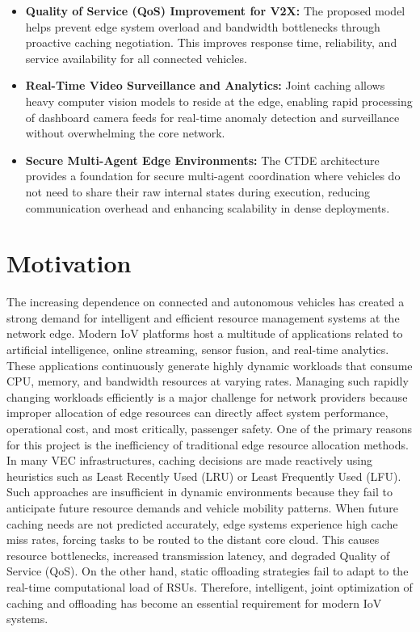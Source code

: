 \documentclass[12pt,a4paper]{report}
\begin{document}
\begin{itemize}
\item \textbf{Quality of Service (QoS) Improvement for V2X:}  
The proposed model helps prevent edge system overload and bandwidth bottlenecks through proactive caching negotiation. This improves response time, reliability, and service availability for all connected vehicles.

\item \textbf{Real-Time Video Surveillance and Analytics:}  
Joint caching allows heavy computer vision models to reside at the edge, enabling rapid processing of dashboard camera feeds for real-time anomaly detection and surveillance without overwhelming the core network.

\item \textbf{Secure Multi-Agent Edge Environments:}  
The CTDE architecture provides a foundation for secure multi-agent coordination where vehicles do not need to share their raw internal states during execution, reducing communication overhead and enhancing scalability in dense deployments.

\end{itemize}

\chapter{Motivation}

The increasing dependence on connected and autonomous vehicles has created a strong demand for intelligent and efficient resource management systems at the network edge. Modern IoV platforms host a multitude of applications related to artificial intelligence, online streaming, sensor fusion, and real-time analytics. These applications continuously generate highly dynamic workloads that consume CPU, memory, and bandwidth resources at varying rates. Managing such rapidly changing workloads efficiently is a major challenge for network providers because improper allocation of edge resources can directly affect system performance, operational cost, and most critically, passenger safety. One of the primary reasons for this project is the inefficiency of traditional edge resource allocation methods. In many VEC infrastructures, caching decisions are made reactively using heuristics such as Least Recently Used (LRU) or Least Frequently Used (LFU). Such approaches are insufficient in dynamic environments because they fail to anticipate future resource demands and vehicle mobility patterns. When future caching needs are not predicted accurately, edge systems experience high cache miss rates, forcing tasks to be routed to the distant core cloud. This causes resource bottlenecks, increased transmission latency, and degraded Quality of Service (QoS). On the other hand, static offloading strategies fail to adapt to the real-time computational load of RSUs. Therefore, intelligent, joint optimization of caching and offloading has become an essential requirement for modern IoV systems.\\
\end{document}
